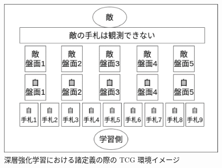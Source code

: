 \documentclass[12pt]{jarticle}
\begin{document}
\vspace{-0.3cm}
\begin{figure}[t]
  \centering
  \includegraphics[width=150mm]{assets/cardgameimage.eps}
  \vspace{-0.3cm}
  \caption{深層強化学習における諸定義の際の TCG 環境イメージ}
  \label{fig:CardGameImage}
\end{figure}
\end{document}
